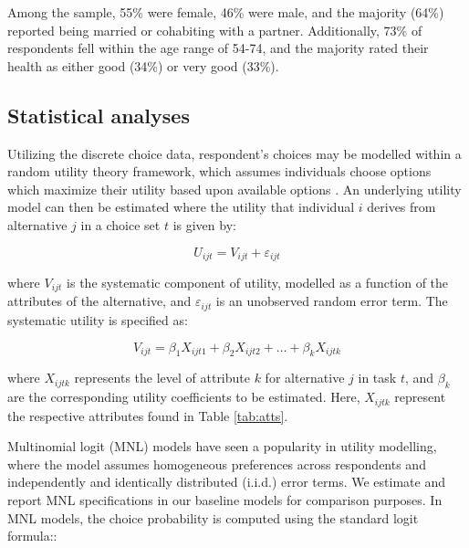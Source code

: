 \documentclass[3p,11pt ]{elsarticle}
\begin{document}
Among the sample, 55\% were female, 46\% were male, and the majority (64\%) reported being married or cohabiting with a partner. Additionally, 73\% of respondents fell within the age range of 54-74, and the majority rated their health as either good (34\%) or very good (33\%).


%






\subsection{Statistical analyses}

Utilizing the discrete choice data,
respondent's choices may be modelled within a random utility theory framework,
which assumes individuals choose options which maximize their utility based upon available options \citep{lancsarConductingDiscreteChoice2008}.
An underlying utility model can then be estimated where the utility that individual \( i \) derives from alternative \( j \) in a choice set \( t \) is given by:

\begin{equation}
U_{ijt} = V_{ijt} + \varepsilon_{ijt}
\end{equation}

\noindent where \( V_{ijt} \) is the systematic component of utility, modelled as a function of the attributes of the alternative, and \( \varepsilon_{ijt} \) is an unobserved random error term.
The systematic utility is specified as:

\begin{equation}
V_{ijt} = \beta_1 X_{ijt1} + \beta_2 X_{ijt2} + \ldots + \beta_k X_{ijtk}
\end{equation}

\noindent where \( X_{ijtk} \) represents the level of attribute \( k \) for alternative \( j \) in task \( t \), and \( \beta_k \) are the corresponding utility coefficients to be estimated.
Here,
\( X_{ijtk} \) represent the respective attributes found in Table \ref{tab:atts}.

Multinomial logit (MNL) models have seen a popularity in utility modelling,
where the model assumes homogeneous preferences across respondents and independently and identically distributed (i.i.d.) error terms.
We estimate and report MNL specifications in our baseline models for comparison purposes.
In MNL models,
the choice probability is computed using the standard logit formula::
\end{document}
